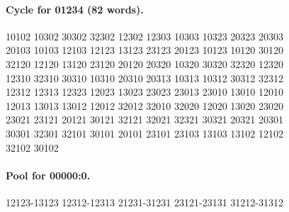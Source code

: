 \paragraph{Cycle for 01234 (82 words).}
\begingroup\footnotesize\ttfamily\begin{flushleft}
10102 10302 30302 32302 12302 12303 10303 10323 20323 20303\\
20103 10103 12103 12123 13123 23123 20123 10123 10120 30120\\
32120 12120 13120 23120 20120 20320 10320 30320 32320 12320\\
12310 32310 30310 10310 20310 20313 10313 10312 30312 32312\\
12312 12313 12323 12023 13023 23023 23013 23010 13010 12010\\
12013 13013 13012 12012 32012 32010 32020 12020 13020 23020\\
23021 23121 20121 30121 32121 32021 32321 30321 20321 20301\\
30301 32301 32101 30101 20101 23101 23103 13103 13102 12102\\
32102 30102\\
\end{flushleft}\endgroup
\paragraph{Pool for 00000:0.}
\begingroup\footnotesize\ttfamily\begin{flushleft}
12123-13123 12312-12313 21231-31231 23121-23131 31212-31312\\
\end{flushleft}\endgroup
